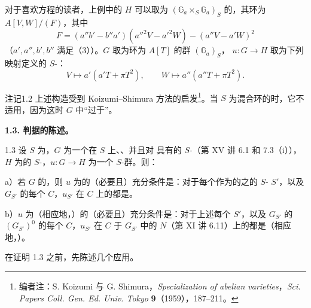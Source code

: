 对于喜欢方程的读者，上例中的 $H$ 可以取为 $(\mathbb G_a\times_S\mathbb G_a)_S$ 的，其环为 $A[V,W]/(F)$，其中
\[
F=(a''b'-b''a')(a''^2V-a'^2W)-(a''V-a'W)^2
\]
（$a',a'',b',b''$ 满足（3））。$G$ 取为环为 $A[T]$ 的群 $(\mathbb G_a)_S$， $u:G\to H$ 取为下列映射定义的 $S$-：
\[V\longmapsto a'(a'T+\pi T^2),\qquad W\longmapsto a''(a''T+\pi T^2).\]
\begin{SGAresult}{注记}{1.2}
上述构造受到 Koizumi--Shimura 方法的启发\footnote{编者注：S. Koizumi 与 G. Shimura，\textit{Specialization of abelian varieties}，\textit{Sci. Papers Coll. Gen. Ed. Univ. Tokyo} \textbf{9}（1959），187--211。}。当 $S$ 为混合环的时，它不适用，因为这时 $G$ 中“过于”。
\end{SGAresult}
\textbf{1.3. 判据的陈述。}
\begin{SGAresult}{}{1.3}
设 $S$ 为，$G$ 为一个在 $S$ 上、、并且对 具有的 $S$-（第 XV 讲 6.1 和 7.3（i）），$H$ 为的 $S$-，$u:G\to H$ 为一个 $S$-群。则：

 a）若 $G$ 的，则 $u$ 为的（必要且）充分条件是：对于每个作为的之的 $S$- $S'$，以及 $G_{S'}$ 的每个 $C$，$u_{S'}$ 在 $C$ 上的都是。

 b）$u$ 为（相应地，）的（必要且）充分条件是：对于上述每个 $S'$，以及 $G_{S'}$ 的 $(G_{S'})^0$ 的每个 $C$，$u_{S'}$ 在 $C$ 于 $G_{S'}$ 中的 $N$（第 XI 讲 6.11）上的都是（相应地，）。
\end{SGAresult}
在证明 1.3 之前，先陈述几个应用。
